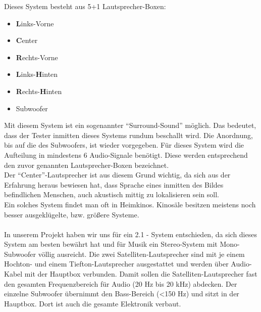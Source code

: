 Dieses System besteht aus 5+1 Lautsprecher-Boxen:
\begin{itemize}
	\item \textbf{L}inks-Vorne
	\item \textbf{C}enter
	\item \textbf{R}echts-Vorne
	\item \textbf{L}inks-\textbf{H}inten
	\item \textbf{R}echts-\textbf{H}inten
	\item Subwoofer
\end{itemize}
Mit diesem System ist ein sogenannter \enquote{Surround-Sound} möglich.
Das bedeutet, dass der Tester inmitten dieses Systems rundum beschallt wird.
Die Anordnung, bis auf die des Subwoofers, ist wieder vorgegeben.
Für dieses System wird die Aufteilung in mindestens 6 Audio-Signale benötigt.
Diese werden entsprechend den zuvor genannten Lautsprecher-Boxen bezeichnet.\\
Der \enquote{Center}-Lautsprecher ist aus diesem Grund wichtig, da sich aus der Erfahrung heraus bewiesen hat, dass Sprache eines inmitten des Bildes befindlichen Menschen, auch akustisch mittig zu lokalisieren sein soll.\\ 
Ein solches System findet man oft in Heimkinos.
Kinosäle besitzen meistens noch besser ausgeklügelte, bzw. größere Systeme.
\\ \\


In unserem Projekt haben wir uns für ein 2.1 - System entschieden, da sich dieses System am besten bewährt hat und für Musik ein Stereo-System mit Mono-Subwoofer völlig ausreicht.
Die zwei Satelliten-Lautsprecher sind mit je einem Hochton- und einem Tiefton-Lautsprecher ausgestattet und werden über Audio-Kabel mit der Hauptbox verbunden.
Damit sollen die Satelliten-Lautsprecher fast den gesamten Frequenzbereich für Audio (20 Hz bis 20 kHz) abdecken.
Der einzelne Subwoofer übernimmt den Bass-Bereich (<150 Hz) und sitzt in der Hauptbox.
Dort ist auch die gesamte Elektronik verbaut.


\newpage
